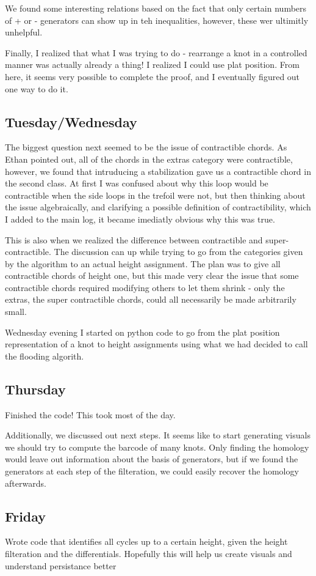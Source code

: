 \documentclass[11pt,oneside]{amsart}
\begin{document}
We found some interesting relations based on the fact that only certain numbers of + or - generators can show up in teh inequalities, however, these wer ultimitly unhelpful.

Finally, I realized that what I was trying to do - rearrange a knot in a controlled manner was actually already a thing! I realized I could use plat position. From here, it seems very possible to complete the proof, and I eventually figured out one way to do it.


\subsection{Tuesday/Wednesday}

The biggest question next seemed to be the issue of contractible chords. As Ethan pointed out, all of the chords in the extras category were contractible, however, we found that intruducing a stabilization gave us a contractible chord in the second class. At first I was confused about why this loop would be contractible when the side loops in the trefoil were not, but then thinking about the issue algebraically, and clarifying a possible definition of contractibility, which I added to the main log, it became imediatly obvious why this was true. 

This is also when we realized the difference between contractible and super-contractible. The discussion can up while trying to go from the categories given by the algorithm to an actual height assignment. The plan was to give all contractible chords of height one, but this made very clear the issue that some contractible chords required modifying others to let them shrink - only the extras, the super contractible chords, could all necessarily be made arbitrarily small. 

Wednesday evening I started on python code to go from the plat position representation of a knot to height assignments using what we had decided to call the flooding algorith.


\subsection{Thursday}

Finished the code! This took most of the day. 

Additionally, we discussed out next steps. It seems like to start generating visuals we should try to compute the barcode of many knots. Only finding the homology would leave out information about the basis of generators, but if we found the generators at each step of the filteration, we could easily recover the homology afterwards.


\subsection{Friday}

Wrote code that identifies all cycles up to a certain height, given the height filteration and the differentials. Hopefully this will help us create visuals and understand persistance better




 
\end{document}
